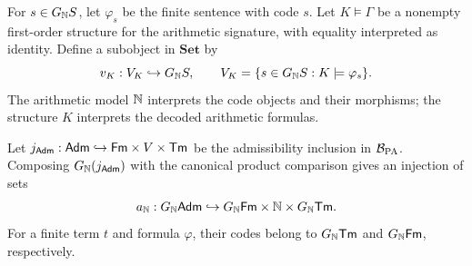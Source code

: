 For $s\in G_{\mathbb N}S$, let $\varphi_s$ be the finite sentence with
code $s$. Let $K\models\Gamma$ be a nonempty first-order
structure for the arithmetic signature, with equality interpreted
as identity. Define a subobject in $\mathbf{Set}$ by
\[
 v_K:V_K\hookrightarrow G_{\mathbb N}S,
 \qquad
 V_K=\{s\in G_{\mathbb N}S:K\models\varphi_s\}.
\]
The arithmetic model $\mathbb N$ interprets the code objects and their
morphisms; the structure $K$ interprets the decoded arithmetic
formulas.

Let $j_{\mathsf{Adm}}:\mathsf{Adm}\hookrightarrow\mathsf{Fm}\times V\times\mathsf{Tm}$
be the admissibility inclusion in $\mathcal B_{\mathrm{PA}}$.
Composing $G_{\mathbb N}(j_{\mathsf{Adm}})$ with the canonical product
comparison gives an injection of sets
\[
 a_{\mathbb N}:G_{\mathbb N}\mathsf{Adm}\hookrightarrow
             G_{\mathbb N}\mathsf{Fm}\times\mathbb N\times G_{\mathbb N}\mathsf{Tm}.
\]
For a finite term $t$ and formula $\varphi$, their codes belong
to $G_{\mathbb N}\mathsf{Tm}$ and $G_{\mathbb N}\mathsf{Fm}$, respectively.

